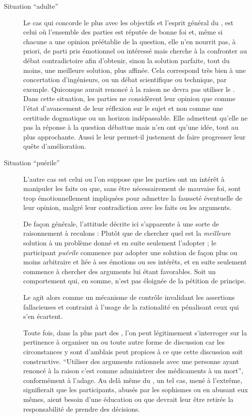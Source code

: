 \begin{description}
  \item[Situation \enquote{adulte}] Le cas qui concorde le plus avec les objectifs et l’esprit général du \mainabbr{}, est celui où l’ensemble des parties est réputée de bonne foi et, même si chacune a une opinion préétablie de la question, elle n’en nourrit pas, à priori, de parti pris émotionnel ou intéressé mais cherche à la confronter au débat contradictoire afin d’obtenir, sinon la solution parfaite, tout du moins, une meilleure solution, plus affinée. Cela correspond très bien à une concertation d’ingénieurs, ou un débat scientifique ou technique, par exemple. Quiconque aurait renoncé à la raison ne devra pas utiliser le \mainabbr{}.
Dans cette situation, les parties ne considèrent leur opinion que comme l’état d’avancement de leur réflexion sur le sujet et non comme une certitude dogmatique ou un horizon indépassable. Elle admettent qu’elle ne  pas la réponse à la question débattue mais n’en ont qu’une idée, tout au plus approchante. Aussi le \mainabbr{} leur permet-il justement de faire progresser leur quête d’amélioration.

  \item[Situation \enquote{puérile}] L’autre cas est celui ou l’on suppose que les parties ont un intérêt à manipuler les faits ou que, sans être nécessairement de mauvaise foi, sont trop émotionnellement impliquées pour admettre la fausseté éventuelle de leur opinion, malgré leur contradiction avec les faits ou les arguments.

  De façon générale, l’attitude décrite ici s’apparente à une sorte de raisonnement à reculons : Plutôt que de chercher quel est la \emph{meilleure} solution à un problème donné et en suite seulement l’adopter ; le participant \emph{puérile} commence par adopter une solution  de façon plus ou moins arbitraire et liée à ses émotions ou ses intérêts, et en suite seulement commence à chercher des arguments lui étant favorables. Soit un comportement qui, en somme, n’est pas éloignée de la pétition de principe.

  Le \mainabbr{} agit alors comme un mécanisme de contrôle invalidant les assertions fallacieuses et contraint à l’usage de la rationalité en pénalisant ceux qui s’en écartent.

  Toute fois, dans la plus part des , l’on peut légitimement s’interroger sur la pertinence à organiser un \mainabbr{} ou toute autre forme de discussion car les circonstances y sont d’amblais peut propices à ce que cette discussion soit constructive. \enquote{Utiliser des arguments rationnels avec une personne ayant renoncé à la raison c’est comme administrer des médicaments à un mort}\nocite{thomasPain1776AmercianCrisis}, conformément à l’adage. Au delà même du \mainabbr{}, un tel cas, mené à l’extrême, signifierait que les participants, abusés par les sophismes ou en abusant eux mêmes, aient besoin d’une éducation ou que devrait leur être retirée la responsabilité de prendre des décisions.
\end{description}


